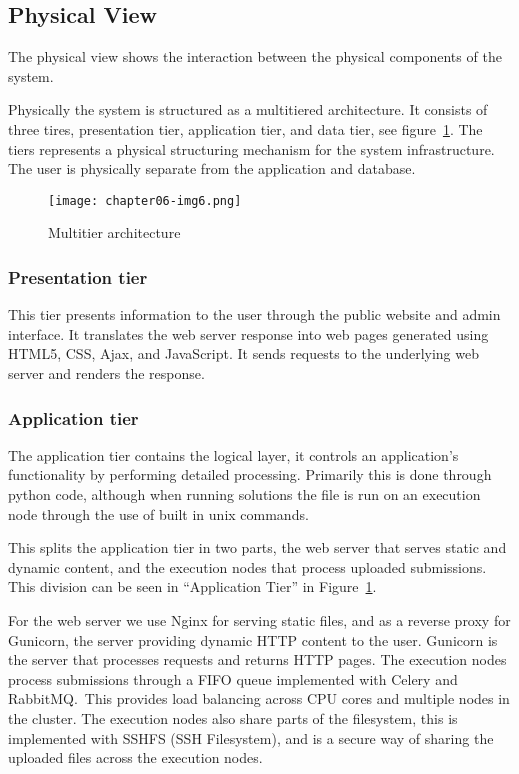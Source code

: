 \subsection{Physical View}
\label{sec:physicalView}

The physical view shows the interaction between the physical components
of the system.

Physically the system is structured as a multitiered architecture. It
consists of three tires, presentation tier, application tier, and data
tier, see figure~\ref{fig:multitier}. The tiers represents a physical
structuring mechanism for the system infrastructure. The user is physically
separate from the application and database. 

\begin{figure}[h]
	\centering
	\texttt{[image: chapter06-img6.png]}
	\caption{Multitier architecture}
	\label{fig:multitier}
\end{figure}
\subsubsection{Presentation tier}

This tier presents information to the user through the public website
and admin interface. It translates the web server response into web
pages generated using HTML5, CSS, Ajax, and JavaScript. It sends
requests to the underlying web server and renders the response.

\subsubsection{Application tier}\label{section:applicationTier}

The application tier contains the logical layer, it controls an
application's functionality by performing detailed
processing. Primarily this is done through python code, although when
running solutions the file is run on an execution node through the use
of built in unix commands. 

This splits the application tier in two parts, the web server that
serves static and dynamic content, and the execution nodes that process
uploaded submissions. This division can be seen in
``Application Tier'' in Figure~\ref{fig:multitier}.


For the web server we use Nginx for serving static files, and as a
reverse proxy for Gunicorn, the server providing dynamic HTTP content
to the user. Gunicorn is the server that processes requests and returns
HTTP pages. The execution nodes process submissions through a FIFO
queue implemented with Celery and RabbitMQ.\ This provides load
balancing across CPU cores and multiple nodes in the cluster. The
execution nodes also share parts of the filesystem, this is implemented
with SSHFS (SSH Filesystem), and is a secure way of sharing the
uploaded files across the execution nodes. 


